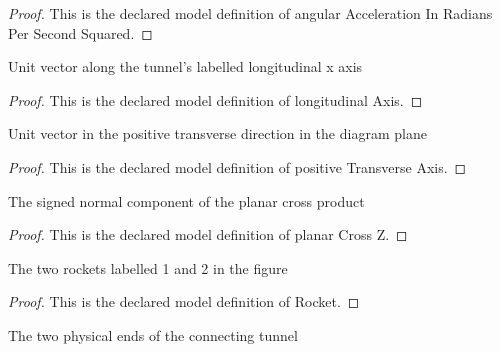 \begin{proof}
  This is the declared model definition of angular Acceleration In Radians Per Second Squared.
\end{proof}
\begin{definition}
  \label{def:physics:phyx-mini-0703:phyxminiproblems-problemphyxmini0703-longitudinalaxis}
  Unit vector along the tunnel's labelled longitudinal x axis
\end{definition}
\begin{proof}
  This is the declared model definition of longitudinal Axis.
\end{proof}
\begin{definition}
  \label{def:physics:phyx-mini-0703:phyxminiproblems-problemphyxmini0703-positivetransverseaxis}
  Unit vector in the positive transverse direction in the diagram plane
\end{definition}
\begin{proof}
  This is the declared model definition of positive Transverse Axis.
\end{proof}
\begin{definition}
  \label{def:physics:phyx-mini-0703:phyxminiproblems-problemphyxmini0703-planarcrossz}
  The signed normal component of the planar cross product
\end{definition}
\begin{proof}
  This is the declared model definition of planar Cross Z.
\end{proof}
\begin{definition}[Rocket]
  \label{def:physics:phyx-mini-0703:phyxminiproblems-problemphyxmini0703-rocket}
  The two rockets labelled 1 and 2 in the figure
\end{definition}
\begin{proof}
  This is the declared model definition of Rocket.
\end{proof}
\begin{definition}
  \label{def:physics:phyx-mini-0703:phyxminiproblems-problemphyxmini0703-tunnelend}
  The two physical ends of the connecting tunnel
\end{definition}
